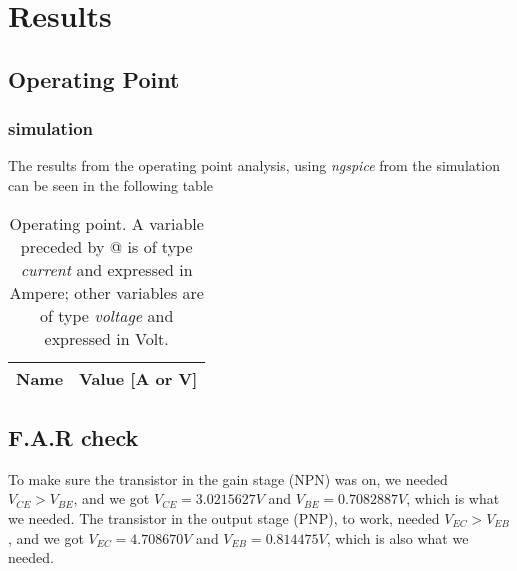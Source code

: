 \section{Results}
\label{sec:res}
\subsection{Operating Point}
\subsubsection{simulation}
The results from the operating point analysis, using \textit{ngspice} from the simulation can be seen in the following table
\begin{table}[H]
  \centering
  \begin{tabular}{|l|r|}
    \hline    
    {\bf Name} & {\bf Value [A or V]} \\ \hline
    
  \end{tabular}
  \caption{Operating point. A variable preceded by @ is of type {\em current}
    and expressed in Ampere; other variables are of type {\it voltage} and expressed in
    Volt.}
  \label{tab:op}
\end{table}
\subsection{F.A.R check}
To make sure the transistor in the gain stage (NPN) was on, we needed $V_{CE} > V_{BE}$, and we got $V_{CE}=3.0215627 V$ and $V_{BE}=0.7082887 V$, which is what we needed.
The transistor in the output stage (PNP), to work, needed $V_{EC} > V_{EB}$, and we got $V_{EC}=4.708670V$ and $V_{EB}=0.814475V$, which is also what we needed.

